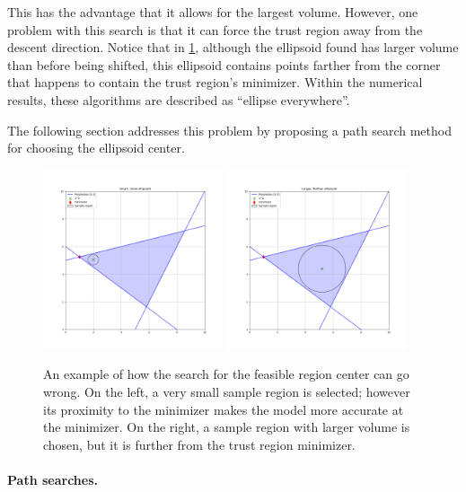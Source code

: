\documentclass{article}
\begin{document}
This has the advantage that it allows for the largest volume.
However, one problem with this search is that it can force the trust region away from the descent direction.
Notice that in \cref{ellipse_runs_away}, although the ellipsoid found has larger volume than before being shifted, 
this ellipsoid contains points farther from the corner that happens to contain the trust region's minimizer.
Within the numerical results, these algorithms are described as ``ellipse everywhere''.

The following section addresses this problem by proposing a path search method for choosing the ellipsoid center.

\begin{figure}[ht]
    \centering
    \includegraphics[width=200px]{images/worse_larger_ellipsoid_1.png}
    \includegraphics[width=200px]{images/worse_larger_ellipsoid_2.png}
    \caption[An example of how the search for the sample region center can go wrong.]{
    	An example of how the search for the feasible region center can go wrong.  
     	On the left, a very small sample region is selected; however its proximity to the minimizer makes the model more accurate at the minimizer.
    	On the right, a sample region with larger volume is chosen, but it is further from the trust region minimizer.
	}
    \label{ellipse_runs_away}
\end{figure}


\paragraph{Path searches.}
\end{document}

